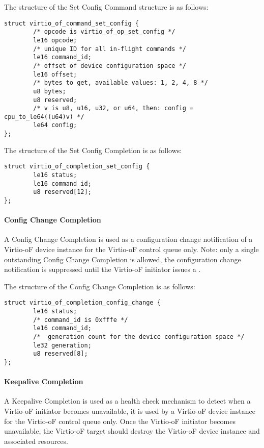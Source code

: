 The structure of the Set Config Command structure is as follows:
\begin{lstlisting}
struct virtio_of_command_set_config {
        /* opcode is virtio_of_op_set_config */
        le16 opcode;
        /* unique ID for all in-flight commands */
        le16 command_id;
        /* offset of device configuration space */
        le16 offset;
        /* bytes to get, available values: 1, 2, 4, 8 */
        u8 bytes;
        u8 reserved;
        /* v is u8, u16, u32, or u64, then: config = cpu_to_le64((u64)v) */
        le64 config;
};
\end{lstlisting}

The structure of the Set Config Completion is as follows:
\begin{lstlisting}
struct virtio_of_completion_set_config {
        le16 status;
        le16 command_id;
        u8 reserved[12];
};
\end{lstlisting}

\paragraph{Config Change Completion}\label{sec:Virtio Transport Options / Virtio Over Fabrics / Commands Definition / Opcodes / Config Change Completion}
A Config Change Completion is used as a configuration change notification of a Virtio-oF device instance for the Virtio-oF control queue only.
Note: only a single outstanding Config Change Completion is allowed, the configuration change notification is suppressed until the Virtio-oF initiator issues a
.

The structure of the Config Change Completion is as follows:
\begin{lstlisting}
struct virtio_of_completion_config_change {
        le16 status;
        /* command_id is 0xfffe */
        le16 command_id;
        /*  generation count for the device configuration space */
        le32 generation;
        u8 reserved[8];
};
\end{lstlisting}

\paragraph{Keepalive Completion}\label{sec:Virtio Transport Options / Virtio Over Fabrics / Commands Definition / Opcodes / Keepalive Completion}
A Keepalive Completion is used as a health check mechanism to detect when a Virtio-oF initiator becomes unavailable, it is used by a Virtio-oF device instance for the Virtio-oF control queue only.
Once the Virtio-oF initiator becomes unavailable, the Virtio-oF target should destroy the Virtio-oF device instance and associated resources.


